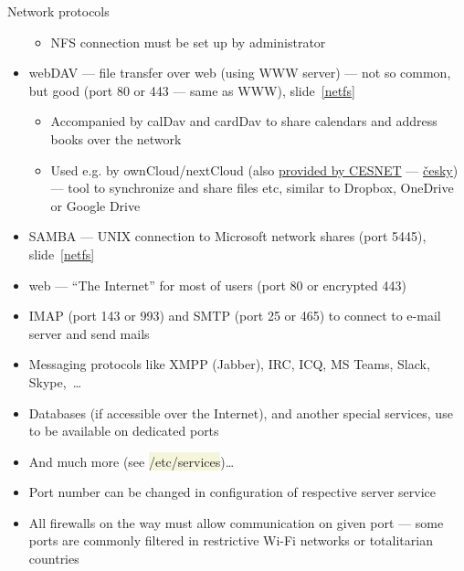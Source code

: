 \documentclass[compress, xelatex, 11pt, xcolor=svgnames, aspectratio=169,
	hyperref={
		bookmarks=true,
		unicode=true,
		colorlinks=true,
		pdftitle={Linux, command line and MetaCentrum},
		plainpages=false,
		pdfauthor={Vojtech Zeisek},
		pdfsubject={Course about use of Linux command line, writing shell scripts and using MetaCentrum of CESNET},
		pdfcreator={XeLaTeX},
		pdfkeywords={Linux, GNU, BASH, shell, command line, MetaCentrum},
		linkcolor=DarkRed, %
		anchorcolor=DarkBlue, %
		citecolor=Indigo, %
		filecolor=NavyBlue, %
		menucolor=DarkMagenta, %
		urlcolor=DarkBlue, %
		},
	url={hyphens, lowtilde} %
	]{beamer}
\renewcommand{\texttt}[1]{\colorbox{Beige}{{\ttfamily #1}}}
\begin{document}
\begin{frame}[allowframebreaks]{Network protocols}
\begin{itemize}
		\begin{itemize}
			\item NFS connection must be set up by administrator
		\end{itemize}
		\item webDAV --- file transfer over web (using WWW server) --- not so common, but good (port 80 or 443 --- same as WWW), slide~\ref{netfs}
		\begin{itemize}
			\item Accompanied by calDav and cardDav to share calendars and address books over the network
			\item Used e.g. by ownCloud/nextCloud (also \href{https://du.cesnet.cz/en/navody/owncloud/start}{provided by CESNET} --- \href{https://du.cesnet.cz/cs/navody/owncloud/start}{česky}) --- tool to synchronize and share files etc, similar to Dropbox, OneDrive or Google Drive
		\end{itemize}
		\item SAMBA --- UNIX connection to Microsoft network shares (port 5445), slide~\ref{netfs}
		\item web --- \enquote{The Internet} for most of users (port 80 or encrypted 443)
		\item IMAP (port 143 or 993) and SMTP (port 25 or 465) to connect to e-mail server and send mails
		\item Messaging protocols like XMPP (Jabber), IRC, ICQ, MS Teams, Slack, Skype,~\ldots
		\item Databases (if accessible over the Internet), and another special services, use to be available on dedicated ports
		\item And much more (see \texttt{/etc/services})\ldots
		\item Port number can be changed in configuration of respective server service
		\item All firewalls on the way must allow communication on given port --- some ports are commonly filtered in restrictive Wi-Fi networks or totalitarian countries
	\end{itemize}
\end{frame}
\end{document}
